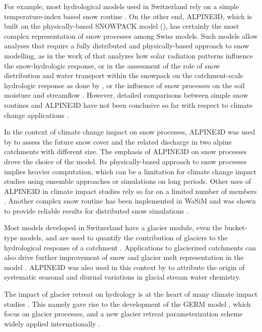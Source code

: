 \documentclass[10pt,a4paper]{article}
\begin{document}
For example, most hydrological models used in Switzerland rely on a simple temperature-index based snow routine \citep[see for example][]{Jenicek2018}. On the other end, ALPINE3D, which is built on the physically-based SNOWPACK model (\citealt{Bartelt2002, Lehning2002a, Lehning2002b}), has certainly the most complex representation of snow processes among Swiss models. Such models allow analyses that require a fully distributed and physically-based approach to snow modelling, as in the work of \citet{Comola2015a} that analyzes how solar radiation patterns influence the snow-hydrologic response, or in the assessment of the role of snow distribution and water transport within the snowpack on the catchment-scale hydrologic response as done by \citet{Brauchli2017}, or the influence of snow processes on the soil moisture and streamflow \citep{Wever2017}. However, detailed comparisons between simple snow routines and ALPINE3D have not been conclusive so far with respect to climate change applications \citep{Kobierska2011, Shakoor2018}.

In the context of climate change impact on snow processes, ALPINE3D was used by \citet{Bavay2009} to assess the future snow cover and the related discharge in two alpine catchments with different size. The emphasis of ALPINE3D on snow processes drove the choice of the model. Its physically-based approach to snow processes implies heavier computation, which can be a limitation for climate change impact studies using ensemble approaches or simulations on long periods. Other uses of ALPINE3D in climate impact studies rely so far on a limited number of members \citep[climate scenarios or climate model chains;][]{Bavay2013, Marty2017}. Another complex snow routine has been implemented in WaSiM and was shown to provide reliable results for distributed snow simulations \citep{Thornton2021}. 

Most models developed in Switzerland have a glacier module, even the bucket-type models, and are used to quantify the contribution of glaciers to the hydrological response of a catchment \citep[see for example][]{Verbunt2003, Zappa2007a, Uhlmann2013a}. Applications to glacierized catchments can also drive further improvement of snow and glacier melt representation in the model \citep{Finger_2011}. ALPINE3D was also used in this context by \citet{Hindshaw2011} to attribute the origin of systematic seasonal and diurnal variations in glacial stream water chemistry.

The impact of glacier retreat on hydrology is at the heart of many climate impact studies \citep{Horton2006, Schaefli2007b, Junghans2011, Addor2014, Finger2015, Etter2017}. This namely gave rise to the development of the GERM model \citep{Huss2016, Junghans2011, Farinotti2012, Finger2013}, which focus on glacier processes, and a new glacier retreat parameterization scheme widely applied internationally \citep{Huss2010}.
\end{document}
